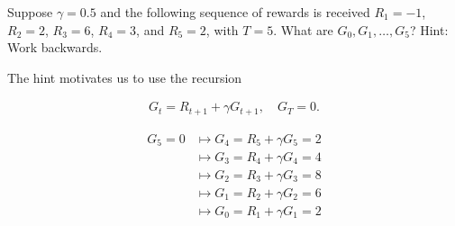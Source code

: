
\begin{exercise}[Exercise 3.8]

Suppose $\gamma = 0.5$ and the following sequence of rewards is received $R_1 = -1$, $R_2 = 2$, $R_3 = 6$, $R_4 = 3$, and $R_5 = 2$, with $T = 5$.
What are $G_0, G_1 , \dots, G_5$?
Hint:
Work backwards.    

\end{exercise}


\begin{solution}

The hint motivates us to use the recursion \cite*[page 55]{SuttonRichardS2018Rl:a}

\begin{align} \label{eq:3.9} \tag{3.9}
	G_t = R_{t+1} + \gamma G_{t+1},
	\quad
	G_T = 0.
\end{align}

\begin{align*}
    G_5 = 0 & \mapsto G_4 = R_5 + \gamma G_5 = 2 \\
            & \mapsto G_3 = R_4 + \gamma G_4 = 4 \\
            & \mapsto G_2 = R_3 + \gamma G_3 = 8 \\
            & \mapsto G_1 = R_2 + \gamma G_2 = 6 \\
            & \mapsto G_0 = R_1 + \gamma G_1 = 2
\end{align*}

\end{solution}

